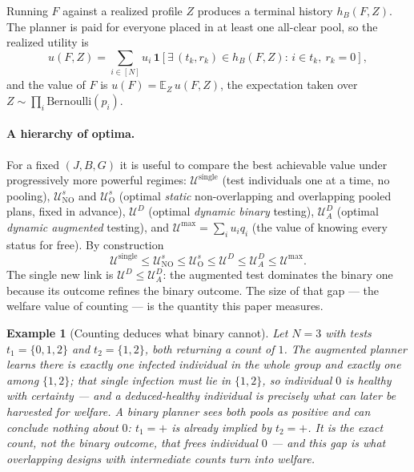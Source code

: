 \documentclass[11pt]{article}
\newtheorem{example}{Example}
\begin{document}
Running $F$ against a realized profile $Z$ produces a terminal history
$h_B(F,Z)$. The planner is paid for everyone placed in at least one all-clear
pool, so the realized utility is
\[
  u(F,Z)=\sum_{i\in[N]} u_i\,\mathbf{1}\!\left[\exists\,(t_k,r_k)\in h_B(F,Z):\,
  i\in t_k,\ r_k=0\right],
\]
and the value of $F$ is $u(F)=\mathbb{E}_{Z}\,u(F,Z)$, the expectation taken over
$Z\sim\prod_i \mathrm{Bernoulli}(p_i)$.

\paragraph{A hierarchy of optima.}
For a fixed $(J,B,G)$ it is useful to compare the best achievable value under
progressively more powerful regimes:
$\mathcal{U}^{\mathrm{single}}$ (test individuals one at a time, no pooling),
$\mathcal{U}^{s}_{\mathrm{NO}}$ and $\mathcal{U}^{s}_{\mathrm{O}}$ (optimal
\emph{static} non-overlapping and overlapping pooled plans, fixed in advance),
$\mathcal{U}^{D}$ (optimal \emph{dynamic binary} testing), $\mathcal{U}^{D}_{A}$
(optimal \emph{dynamic augmented} testing), and $\mathcal{U}^{\max}=\sum_i
u_i q_i$ (the value of knowing every status for free). By construction
\[
  \mathcal{U}^{\mathrm{single}} \le
  \mathcal{U}^{s}_{\mathrm{NO}} \le
  \mathcal{U}^{s}_{\mathrm{O}} \le
  \mathcal{U}^{D} \le
  \mathcal{U}^{D}_{A} \le
  \mathcal{U}^{\max}.
\]
The single new link is $\mathcal{U}^{D}\le\mathcal{U}^{D}_{A}$: the augmented
test dominates the binary one because its outcome refines the binary outcome.
The size of that gap --- the welfare value of counting --- is the quantity this
paper measures.

\begin{example}[Counting deduces what binary cannot]
Let $N=3$ with tests $t_1=\{0,1,2\}$ and $t_2=\{1,2\}$, both returning a count of
$1$. The augmented planner learns there is exactly one infected individual in the
whole group and exactly one among $\{1,2\}$; that single infection must lie in
$\{1,2\}$, so individual $0$ is \emph{healthy} with certainty --- and a
deduced-healthy individual is precisely what can later be harvested for welfare. A
binary planner sees both pools as positive and can conclude nothing about $0$:
$t_1{=}+$ is already implied by $t_2{=}+$. It is the exact count, not the binary
outcome, that frees individual $0$ --- and this gap is what overlapping designs
with intermediate counts turn into welfare.
\end{example}
\end{document}
